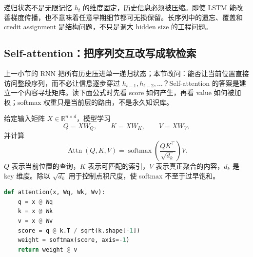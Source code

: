

\begin{warningbox}{递归状态不是无限记忆}
$h_t$ 的维度固定，历史信息必须被压缩。即使 LSTM 能改善梯度传播，也不意味着任意早期细节都可无损保留。长序列中的遗忘、覆盖和 credit assignment 是结构问题，不只是调大 hidden size 的工程问题。
\end{warningbox}

\subsection{Self-attention：把序列交互改写成软检索}

上一小节的 RNN 把所有历史压进单一递归状态；本节改问：能否让当前位置直接访问整段序列，而不必让信息逐步穿过 $h_{t-1},h_{t-2},\ldots$？Self-attention 的答案是建立一个内容寻址矩阵。读下面公式时先看 score 如何产生，再看 value 如何被加权；softmax 权重只是当前层的路由，不是永久知识库。

给定输入矩阵 $X\in\mathbb{R}^{n\times d}$，模型学习
\[
Q=XW_Q,\qquad K=XW_K,\qquad V=XW_V,
\]
并计算
\[
\operatorname{Attn}(Q,K,V)
=\operatorname{softmax}\!\left(\frac{QK^{\top}}{\sqrt{d_k}}\right)V.
\]
$Q$ 表示当前位置的查询，$K$ 表示可匹配的索引，$V$ 表示真正聚合的内容，$d_k$ 是 key 维度。除以 $\sqrt{d_k}$ 用于控制点积尺度，使 softmax 不至于过早饱和。




\begin{lstlisting}[language=Python,caption={Scaled dot-product attention 的最小伪代码}]
def attention(x, Wq, Wk, Wv):
    q = x @ Wq
    k = x @ Wk
    v = x @ Wv
    score = q @ k.T / sqrt(k.shape[-1])
    weight = softmax(score, axis=-1)
    return weight @ v
\end{lstlisting}

